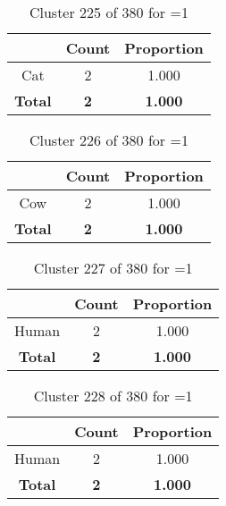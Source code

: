 \begin{table}[ht!]
\centering
\begin{tabular}{|c|c|c|}
\hline
\bf \Spec{} &\bf Count &\bf Proportion\\ \hline \hline
Cat & 2 & 1.000\\ \hline
\hline
\bf Total & \bf 2 & \bf 1.000\\ \hline
\end{tabular}
\label{tab:cluster:225:1}
\caption{Cluster 225 of 380 for \minneigh{}=1}
\end{table}

\begin{table}[ht!]
\centering
\begin{tabular}{|c|c|c|}
\hline
\bf \Spec{} &\bf Count &\bf Proportion\\ \hline \hline
Cow & 2 & 1.000\\ \hline
\hline
\bf Total & \bf 2 & \bf 1.000\\ \hline
\end{tabular}
\label{tab:cluster:226:1}
\caption{Cluster 226 of 380 for \minneigh{}=1}
\end{table}

\begin{table}[ht!]
\centering
\begin{tabular}{|c|c|c|}
\hline
\bf \Spec{} &\bf Count &\bf Proportion\\ \hline \hline
Human & 2 & 1.000\\ \hline
\hline
\bf Total & \bf 2 & \bf 1.000\\ \hline
\end{tabular}
\label{tab:cluster:227:1}
\caption{Cluster 227 of 380 for \minneigh{}=1}
\end{table}

\begin{table}[ht!]
\centering
\begin{tabular}{|c|c|c|}
\hline
\bf \Spec{} &\bf Count &\bf Proportion\\ \hline \hline
Human & 2 & 1.000\\ \hline
\hline
\bf Total & \bf 2 & \bf 1.000\\ \hline
\end{tabular}
\label{tab:cluster:228:1}
\caption{Cluster 228 of 380 for \minneigh{}=1}
\end{table}

